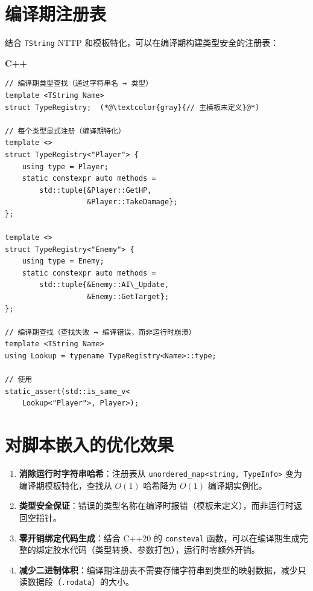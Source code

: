 \documentclass[12pt,a4paper,fontset=fandol]{ctexbook}
\newenvironment{guideline}[1][]{%
  \begin{tcolorbox}[enhanced,breakable,
    colback=blue!5!white,colframe=blue!75!black,
    boxed title style={colback=blue!75!black},
    attach boxed title to top left={yshift=-2mm,xshift=2mm},
    arc=2mm,boxrule=0.8mm,
    title={脚本集成要点},#1]}%
  {\end{tcolorbox}}
\newcommand{\Tp}[1]{\texttt{#1}}
\newcommand{\cpplabel}{%
  \noindent\begin{tcolorbox}[colback=algheadbg,coltext=white,
    sharp corners,boxrule=0pt,width=3.0em,height=1.4em,
    halign=center,valign=center,nobeforeafter,left=0pt,right=0pt,
    top=0pt,bottom=0pt]\small\bfseries C++\end{tcolorbox}}
\begin{document}
\section{编译期注册表}\label{sec:compile-reg}

结合 \Tp{TString} NTTP 和模板特化，可以在编译期构建类型安全的注册表：

\cpplabel
\begin{lstlisting}[style=cppstyle]
// 编译期类型查找（通过字符串名 → 类型）
template <TString Name>
struct TypeRegistry;  (*@\textcolor{gray}{// 主模板未定义}@*)

// 每个类型显式注册（编译期特化）
template <>
struct TypeRegistry<"Player"> {
    using type = Player;
    static constexpr auto methods =
        std::tuple{&Player::GetHP,
                   &Player::TakeDamage};
};

template <>
struct TypeRegistry<"Enemy"> {
    using type = Enemy;
    static constexpr auto methods =
        std::tuple{&Enemy::AI\_Update,
                   &Enemy::GetTarget};
};

// 编译期查找（查找失败 → 编译错误，而非运行时崩溃）
template <TString Name>
using Lookup = typename TypeRegistry<Name>::type;

// 使用
static_assert(std::is_same_v<
    Lookup<"Player">, Player>);
\end{lstlisting}

\section{对脚本嵌入的优化效果}\label{sec:lt-benefit}

\begin{guideline}[title={字面量类型优化脚本嵌入}]
\begin{enumerate}
  \item \textbf{消除运行时字符串哈希}：注册表从 \Tp{unordered\_map<string, TypeInfo>} 变为编译期模板特化，查找从 $O(1)$ 哈希降为 $O(1)$ 编译期实例化。
  \item \textbf{类型安全保证}：错误的类型名称在编译时报错（模板未定义），而非运行时返回空指针。
  \item \textbf{零开销绑定代码生成}：结合 C++20 的 \Tp{consteval} 函数，可以在编译期生成完整的绑定胶水代码（类型转换、参数打包），运行时零额外开销。
  \item \textbf{减少二进制体积}：编译期注册表不需要存储字符串到类型的映射数据，减少只读数据段（\Tp{.rodata}）的大小。
\end{enumerate}
\end{guideline}
\end{document}
